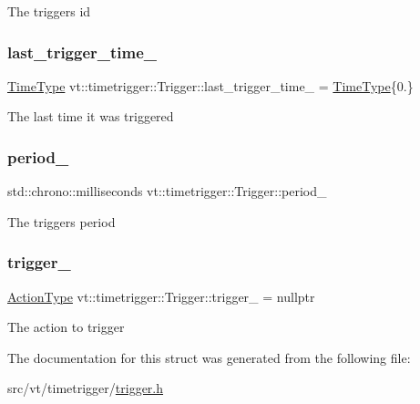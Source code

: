 The trigger\textquotesingle{}s id \mbox{\label{structvt_1_1timetrigger_1_1_trigger_ac844f5940943ca203c90dd485d47a0c6}} 
\subsubsection{\texorpdfstring{last\+\_\+trigger\+\_\+time\+\_\+}{last\_trigger\_time\_}}
{\footnotesize\ttfamily \hyperlink{namespacevt_a2b9f28078dc309ad0706b69ded743e69}{Time\+Type} vt\+::timetrigger\+::\+Trigger\+::last\+\_\+trigger\+\_\+time\+\_\+ = \hyperlink{namespacevt_a2b9f28078dc309ad0706b69ded743e69}{Time\+Type}\{0.\}\hspace{0.3cm}{\ttfamily [private]}}

The last time it was triggered \mbox{\label{structvt_1_1timetrigger_1_1_trigger_aa95009a5d9a17ffdb84b5317a7a5dfc2}} 
\subsubsection{\texorpdfstring{period\+\_\+}{period\_}}
{\footnotesize\ttfamily std\+::chrono\+::milliseconds vt\+::timetrigger\+::\+Trigger\+::period\+\_\+\hspace{0.3cm}{\ttfamily [private]}}

The trigger\textquotesingle{}s period \mbox{\label{structvt_1_1timetrigger_1_1_trigger_ac1d93e6fff9b0faa8889198e481d50d4}} 
\subsubsection{\texorpdfstring{trigger\+\_\+}{trigger\_}}
{\footnotesize\ttfamily \hyperlink{namespacevt_ae0a5a7b18cc99d7b732cb4d44f46b0f3}{Action\+Type} vt\+::timetrigger\+::\+Trigger\+::trigger\+\_\+ = nullptr\hspace{0.3cm}{\ttfamily [private]}}

The action to trigger 

The documentation for this struct was generated from the following file\+:\begin{DoxyCompactItemize}
\item 
src/vt/timetrigger/\hyperlink{trigger_8h}{trigger.\+h}\end{DoxyCompactItemize}
